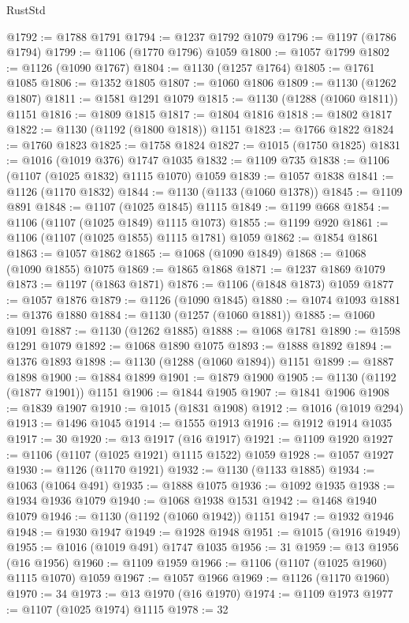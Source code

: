 \begin{lexlean}{RustStd}
\begin{coremodule}
@1792 := @1788 @1791
@1794 := @1237 @1792 @1079
@1796 := @1197 (@1786 @1794)
@1799 := @1106 (@1770 @1796) @1059
@1800 := @1057 @1799
@1802 := @1126 (@1090 @1767)
@1804 := @1130 (@1257 @1764)
@1805 := @1761 @1085
@1806 := @1352 @1805
@1807 := @1060 @1806
@1809 := @1130 (@1262 @1807)
@1811 := @1581 @1291 @1079
@1815 := @1130 (@1288 (@1060 @1811)) @1151
@1816 := @1809 @1815
@1817 := @1804 @1816
@1818 := @1802 @1817
@1822 := @1130 (@1192 (@1800 @1818)) @1151
@1823 := @1766 @1822
@1824 := @1760 @1823
@1825 := @1758 @1824
@1827 := @1015 (@1750 @1825)
@1831 := @1016 (@1019 @376) @1747 @1035
@1832 := @1109 @735
@1838 := @1106 (@1107 (@1025 @1832) @1115 @1070) @1059
@1839 := @1057 @1838
@1841 := @1126 (@1170 @1832)
@1844 := @1130 (@1133 (@1060 @1378))
@1845 := @1109 @891
@1848 := @1107 (@1025 @1845) @1115
@1849 := @1199 @668
@1854 := @1106 (@1107 (@1025 @1849) @1115 @1073)
@1855 := @1199 @920
@1861 := @1106 (@1107 (@1025 @1855) @1115 @1781) @1059
@1862 := @1854 @1861
@1863 := @1057 @1862
@1865 := @1068 (@1090 @1849)
@1868 := @1068 (@1090 @1855) @1075
@1869 := @1865 @1868
@1871 := @1237 @1869 @1079
@1873 := @1197 (@1863 @1871)
@1876 := @1106 (@1848 @1873) @1059
@1877 := @1057 @1876
@1879 := @1126 (@1090 @1845)
@1880 := @1074 @1093
@1881 := @1376 @1880
@1884 := @1130 (@1257 (@1060 @1881))
@1885 := @1060 @1091
@1887 := @1130 (@1262 @1885)
@1888 := @1068 @1781
@1890 := @1598 @1291 @1079
@1892 := @1068 @1890 @1075
@1893 := @1888 @1892
@1894 := @1376 @1893
@1898 := @1130 (@1288 (@1060 @1894)) @1151
@1899 := @1887 @1898
@1900 := @1884 @1899
@1901 := @1879 @1900
@1905 := @1130 (@1192 (@1877 @1901)) @1151
@1906 := @1844 @1905
@1907 := @1841 @1906
@1908 := @1839 @1907
@1910 := @1015 (@1831 @1908)
@1912 := @1016 (@1019 @294)
@1913 := @1496 @1045
@1914 := @1555 @1913
@1916 := @1912 @1914 @1035
@1917 := 30
@1920 := @13 @1917 (@16 @1917)
@1921 := @1109 @1920
@1927 := @1106 (@1107 (@1025 @1921) @1115 @1522) @1059
@1928 := @1057 @1927
@1930 := @1126 (@1170 @1921)
@1932 := @1130 (@1133 @1885)
@1934 := @1063 (@1064 @491)
@1935 := @1888 @1075
@1936 := @1092 @1935
@1938 := @1934 @1936 @1079
@1940 := @1068 @1938 @1531
@1942 := @1468 @1940 @1079
@1946 := @1130 (@1192 (@1060 @1942)) @1151
@1947 := @1932 @1946
@1948 := @1930 @1947
@1949 := @1928 @1948
@1951 := @1015 (@1916 @1949)
@1955 := @1016 (@1019 @491) @1747 @1035
@1956 := 31
@1959 := @13 @1956 (@16 @1956)
@1960 := @1109 @1959
@1966 := @1106 (@1107 (@1025 @1960) @1115 @1070) @1059
@1967 := @1057 @1966
@1969 := @1126 (@1170 @1960)
@1970 := 34
@1973 := @13 @1970 (@16 @1970)
@1974 := @1109 @1973
@1977 := @1107 (@1025 @1974) @1115
@1978 := 32

\end{coremodule}
\end{lexlean}
